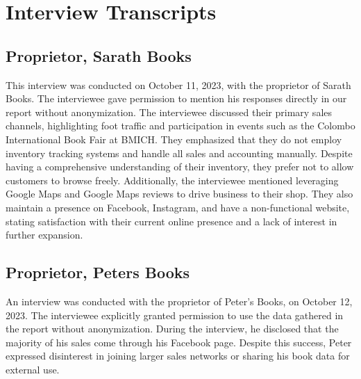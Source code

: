 \section{Interview Transcripts}
\label{appendix-a}

\subsection*{Proprietor, Sarath Books}

This interview was conducted on October 11, 2023, with the proprietor of Sarath Books. The interviewee gave permission to mention his responses directly in our report without anonymization. The interviewee discussed their primary sales channels, highlighting foot traffic and participation in events such as the Colombo International Book Fair at BMICH. They emphasized that they do not employ inventory tracking systems and handle all sales and accounting manually. Despite having a comprehensive understanding of their inventory, they prefer not to allow customers to browse freely. Additionally, the interviewee mentioned leveraging Google Maps and Google Maps reviews to drive business to their shop. They also maintain a presence on Facebook, Instagram, and have a non-functional website, stating satisfaction with their current online presence and a lack of interest in further expansion.

\subsection*{Proprietor, Peters Books}
An interview was conducted with the proprietor of Peter's Books, on October 12, 2023. The interviewee explicitly granted permission to use the data gathered in the report without anonymization. During the interview, he disclosed that the majority of his sales come through his Facebook page. Despite this success, Peter expressed disinterest in joining larger sales networks or sharing his book data for external use.